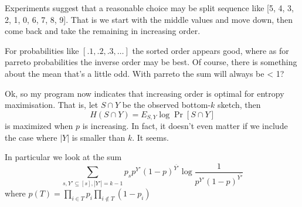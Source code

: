 \documentclass[11pt]{article}
\begin{document}
Experiments suggest that a reasonable choice may be split sequence like [5, 4, 3, 2, 1, 0, 6, 7, 8, 9].
That is we start with the middle values and move down, then come back and take the remaining in increasing order.

For probabilities like $[.1, .2, .3, \dots]$ the sorted order appears good,
where as for parreto probabilities the inverse order may be best.
Of course, there is something about the mean that's a little odd.
With parreto the sum will always be < 1?



Ok, so my program now indicates that increasing order is optimal for entropy maximisation.
That is, let $S\cap Y$ be the observed bottom-$k$ sketch, then
\[
   H(S\cap Y) = E_{S,Y} \log\Pr[S\cap Y]
\]
is maximized when $p$ is increasing.
In fact, it doesn't even matter if we include the case where $|Y|$ is smaller than $k$.
It seems.

In particular we look at the sum
\[
   \sum_{s, Y'\subseteq[s], |Y'|=k-1}
   p_s p^{Y'} (1-p)^{\overline{Y'}}
   \log\frac{1}{
      p^{Y'} (1-p)^{\overline{Y'}}
   }
\]
where $p(T)=\prod_{i\in T} p_i \prod_{i\not\in T}(1-p_i)$
\end{document}
